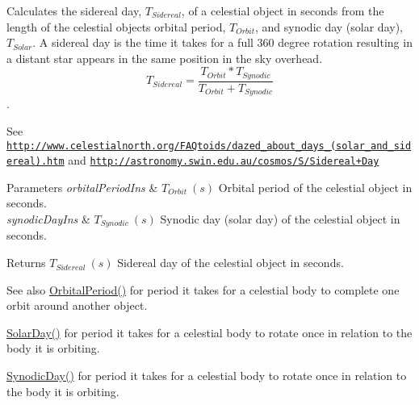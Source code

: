 Calculates the sidereal day, $T_{Sidereal}$, of a celestial object in seconds from the length of the celestial object\textquotesingle{}s orbital period, $T_{Orbit}$, and synodic day (solar day), $T_{Solar}$. A sidereal day is the time it takes for a full 360 degree rotation resulting in a distant star appears in the same position in the sky overhead. \[ T_{Sidereal}=\dfrac{T_{Orbit} * T_{Synodic}}{T_{Orbit} + T_{Synodic}}\]. 

See \href{http://www.celestialnorth.org/FAQtoids/dazed_about_days_(solar_and_sidereal).htm}{\tt http\+://www.\+celestialnorth.\+org/\+F\+A\+Qtoids/dazed\+\_\+about\+\_\+days\+\_\+(solar\+\_\+and\+\_\+sidereal).\+htm} and \href{http://astronomy.swin.edu.au/cosmos/S/Sidereal+Day}{\tt http\+://astronomy.\+swin.\+edu.\+au/cosmos/\+S/\+Sidereal+\+Day}


\begin{DoxyParams}{Parameters}
{\em orbital\+Period\+Ins} & $ T_{Orbit}\ (s)$ Orbital period of the celestial object in seconds. \\
\hline
{\em synodic\+Day\+Ins} & $ T_{Synodic}\ (s)$ Synodic day (solar day) of the celestial object in seconds. \\
\hline
\end{DoxyParams}
\begin{DoxyReturn}{Returns}
$ T_{Sidereal}\ (s)$ Sidereal day of the celestial object in seconds. 
\end{DoxyReturn}
\begin{DoxySeeAlso}{See also}
\mbox{\hyperlink{group___e_g_x_phys-_astrophysic-_orbital_period_ga76aac7afe3b7a30a785259e9eeb0c139}{Orbital\+Period()}} for period it takes for a celestial body to complete one orbit around another object. 

\mbox{\hyperlink{group___e_g_x_phys-_astrophysic-_solar_day_gae321e0dd0c031a57c45b15dc819635e0}{Solar\+Day()}} for period it takes for a celestial body to rotate once in relation to the body it is orbiting. 

\mbox{\hyperlink{group___e_g_x_phys-_astrophysic-_synodic_day_ga637140842bc008c87d90e65b551cbac7}{Synodic\+Day()}} for period it takes for a celestial body to rotate once in relation to the body it is orbiting. 
\end{DoxySeeAlso}
